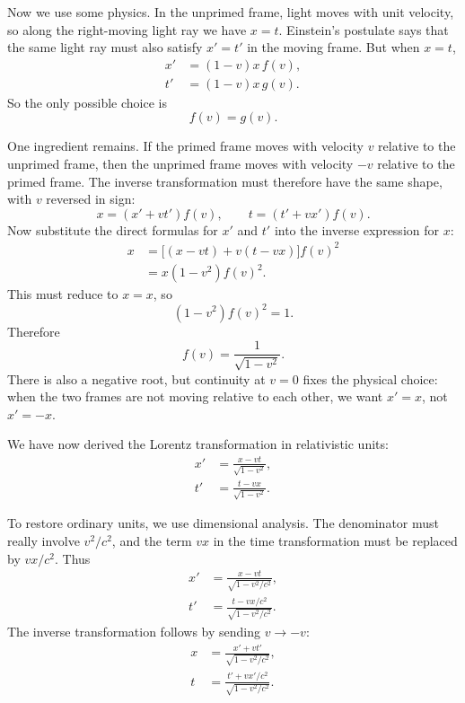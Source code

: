 Now we use some physics. In the unprimed frame, light moves with unit velocity, so along the right-moving light ray we have \(x=t\). Einstein's postulate says that the same light ray must also satisfy \(x'=t'\) in the moving frame. But when \(x=t\),
\begin{align}
x'&=(1-v)x\,f(v),\\
t'&=(1-v)x\,g(v).
\end{align}
So the only possible choice is
\begin{equation}
f(v)=g(v).
\end{equation}

One ingredient remains. If the primed frame moves with velocity \(v\) relative to the unprimed frame, then the unprimed frame moves with velocity \(-v\) relative to the primed frame. The inverse transformation must therefore have the same shape, with \(v\) reversed in sign:
\begin{equation}
x=(x'+vt')f(v),\qquad t=(t'+vx')f(v).
\end{equation}
Now substitute the direct formulas for \(x'\) and \(t'\) into the inverse expression for \(x\):
\begin{align}
x&=\bigl[(x-vt)+v(t-vx)\bigr]f(v)^2 \\
 &=x(1-v^2)f(v)^2.
\end{align}
This must reduce to \(x=x\), so
\begin{equation}
(1-v^2)f(v)^2=1.
\end{equation}
Therefore
\begin{equation}
f(v)=\frac{1}{\sqrt{1-v^2}}.
\end{equation}
There is also a negative root, but continuity at \(v=0\) fixes the physical choice: when the two frames are not moving relative to each other, we want \(x'=x\), not \(x'=-x\).

We have now derived the Lorentz transformation in relativistic units:
\begin{align}
x'&=\frac{x-vt}{\sqrt{1-v^2}}, \\
t'&=\frac{t-vx}{\sqrt{1-v^2}}.
\end{align}

To restore ordinary units, we use dimensional analysis. The denominator must really involve \(v^2/c^2\), and the term \(vx\) in the time transformation must be replaced by \(vx/c^2\). Thus
\begin{align}
x'&=\frac{x-vt}{\sqrt{1-v^2/c^2}}, \\
t'&=\frac{t-vx/c^2}{\sqrt{1-v^2/c^2}}.
\end{align}
The inverse transformation follows by sending \(v\to -v\):
\begin{align}
x&=\frac{x'+vt'}{\sqrt{1-v^2/c^2}}, \\
t&=\frac{t'+vx'/c^2}{\sqrt{1-v^2/c^2}}.
\end{align}

